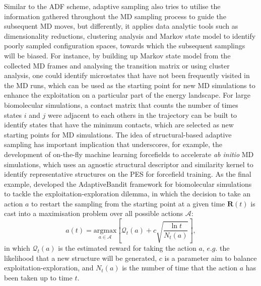 Similar to the ADF scheme, adaptive sampling also tries to utilise the information gathered throughout the MD sampling process  to guide the subsequent MD moves, but differently, it applies data analytic tools such as dimensionality reductions, clustering analysis and Markov state model to identify poorly sampled configuration spaces, towards which the subsequent samplings will be biased. For instance, by building up  Markov state model  from  the collected MD frames and analysing the transition matrix or using cluster analysis, \cite{zimmerman2015fast,doerr2016htmd} one could identify microstates that have not been frequently visited in the MD runs, which can be used as the starting point for new MD simulations to enhance the exploitation on a particular part of the energy landscape. For large biomolecular simulations, a contact matrix\cite{weber2011characterization,doerr2014fly} that counts the number of times states $i$ and $j$ were adjacent to each others in  the trajectory can be built to identify states that have the minimum contacts, which are selected as new starting points for MD simulations. The idea of structural-based adaptive sampling has important implication that underscores, for example, the development of on-the-fly machine learning forcefields\cite{jinnouchi2019fly}  to accelerate \emph{ab initio} MD simulations, which uses an agnostic structural descriptor and similarity kernel\cite{bartok2013representing} to identify representative structures on the PES for forcefield training. As the final example, \citet{perez2020adaptivebandit} developed the AdaptiveBandit framework for biomolecular simulations to tackle the exploitation-exploration dilemma, in which the decision to take an action $a$ to restart the sampling from the starting point at a given time $\bm{R}(t)$ is cast into a maximisation problem over all possible actions $\mathcal{A}$:
\begin{equation*}
    a(t)=\underset{a\in\mathcal{A}}{\mbox{argmax}} \left[\mathcal{Q}_t(a)+c\sqrt{\frac{\ln t}{N_{t}(a)}}\right],
\end{equation*}
in which $\mathcal{Q}_t(a)$ is the estimated reward for taking the action $a$, $e.g.$ the likelihood that a new structure will be generated, $c$ is a parameter aim to balance  exploitation-exploration, and $N_t (a)$ is the number of time that the action $a$ has been taken up to time $t$.
